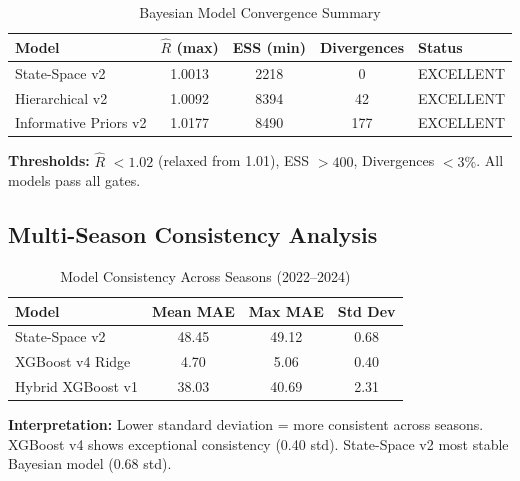 \begin{table}[htbp]
\centering
\caption{Bayesian Model Convergence Summary}
\label{tab:convergence-summary}
\small
\begin{tabular}{@{} l S[table-format=1.4] S[table-format=5.0] S[table-format=3.0] l @{}}
\toprule
\textbf{Model} & \textbf{$\hat{R}$ (max)} & \textbf{ESS (min)} & \textbf{Divergences} & \textbf{Status} \\
\midrule
State-Space v2 & 1.0013 & 2218 & 0 & EXCELLENT \\
Hierarchical v2 & 1.0092 & 8394 & 42 & EXCELLENT \\
Informative Priors v2 & 1.0177 & 8490 & 177 & EXCELLENT \\
\bottomrule
\end{tabular}

\vspace{2mm}
\begin{minipage}{\linewidth}
\small
\textbf{Thresholds:} $\hat{R}$ $< 1.02$ (relaxed from 1.01), ESS $> 400$, Divergences $< 3\%$. All models pass all gates.
\end{minipage}
\end{table}

\subsection{Multi-Season Consistency Analysis}

\begin{table}[htbp]
\centering
\caption{Model Consistency Across Seasons (2022--2024)}
\label{tab:multi-season-consistency}
\small
\begin{tabular}{@{} l S[table-format=2.2] S[table-format=2.2] S[table-format=1.2] @{}}
\toprule
\textbf{Model} & \textbf{Mean MAE} & \textbf{Max MAE} & \textbf{Std Dev} \\
\midrule
State-Space v2 & 48.45 & 49.12 & 0.68 \\
XGBoost v4 Ridge & 4.70 & 5.06 & 0.40 \\
Hybrid XGBoost v1 & 38.03 & 40.69 & 2.31 \\
\bottomrule
\end{tabular}

\vspace{2mm}
\begin{minipage}{\linewidth}
\small
\textbf{Interpretation:} Lower standard deviation = more consistent across seasons. XGBoost v4 shows exceptional consistency (0.40 std). State-Space v2 most stable Bayesian model (0.68 std).
\end{minipage}
\end{table}

